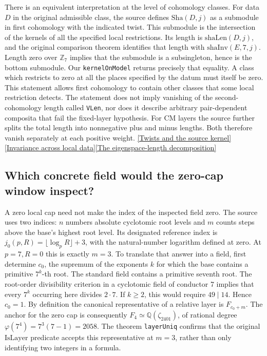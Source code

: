 \documentclass[12pt,letterpaper]{article}
\begin{document}
There is an equivalent interpretation at the level of cohomology classes. For data \(D\) in the original admissible class, the source defines \(\mathrm{Sha}(D,j)\) as a submodule in first cohomology with the indicated twist. This submodule is the intersection of the kernels of all the specified local restrictions. Its length is \(\mathrm{shaLen}(D,j)\), and the original comparison theorem identifies that length with \(\mathrm{shaInv}(E,7,j)\). Length zero over \(\mathbb Z_7\) implies that the submodule is a subsingleton, hence is the bottom submodule. Our \texttt{kernelOnModel} returns precisely that equality. A class which restricts to zero at all the places specified by the datum must itself be zero. This statement allows first cohomology to contain other classes that some local restriction detects. The statement does not imply vanishing of the second-cohomology length called \texttt{VLen}, nor does it describe arbitrary pair-dependent composita that fail the fixed-layer hypothesis. For CM layers the source further splits the total length into nonnegative plus and minus lengths. Both therefore vanish separately at each positive weight. \href{https://github.com/nousentllc/riemann-hypothesis/blob/40e56bab026552e089d7afcfeff08d2defb9c005/src/Formalism/GaloisCohomology/Statement.lean#L65-L81}{[Twists and the source kernel]}\quad\href{https://github.com/nousentllc/riemann-hypothesis/blob/40e56bab026552e089d7afcfeff08d2defb9c005/src/Development/AutomorphicArithmetic/AutomorphicVarieties/GaloisLibrary/GaloisCohomologyLength/ShaLenEqShaInv.lean#L58-L62}{[Invariance across local data]}\quad\href{https://github.com/nousentllc/riemann-hypothesis/blob/40e56bab026552e089d7afcfeff08d2defb9c005/src/Development/AutomorphicArithmetic/AutomorphicVarieties/LengthEqAddEigen.lean#L88-L92}{[The eigenspace-length decomposition]}

\subsection{Which concrete field would the zero-cap window inspect?}

A zero local cap need not make the index of the inspected field zero. The source uses two indices: \(n\) numbers absolute cyclotomic root levels and \(m\) counts steps above the base's highest root level. Its designated reference index is \(j_0(p,R)=\lfloor\log_p R\rfloor+3\), with the natural-number logarithm defined at zero. At \(p=7,R=0\) this is exactly \(m=3\). To translate that answer into a field, first determine \(c_0\), the supremum of the exponents \(k\) for which the base contains a primitive \(7^k\)-th root. The standard field contains a primitive seventh root. The root-order divisibility criterion in a cyclotomic field of conductor 7 implies that every \(7^k\) occurring here divides \(2\cdot7\). If \(k\ge2\), this would require \(49\mid14\). Hence \(c_0=1\). By definition the canonical representative of a relative layer is \(F_{c_0+m}\). The anchor for the zero cap is consequently \(F_4\simeq\mathbb Q(\zeta_{2401})\), of rational degree \(\varphi(7^4)=7^3(7-1)=2058\). The theorem \texttt{layerUniq} confirms that the original \(\mathrm{IsLayer}\) predicate accepts this representative at \(m=3\), rather than only identifying two integers in a formula.
\end{document}
